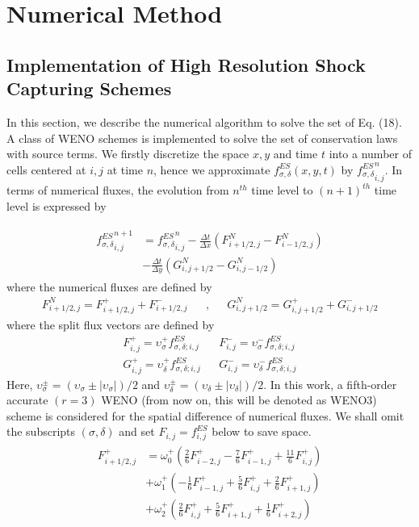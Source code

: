 \documentclass{rsproca}%
\begin{document}
\section{Numerical Method}
\label{sec:4}
\subsection{Implementation of High Resolution Shock Capturing Schemes}
\label{WENO}
In this section, we describe the numerical algorithm to solve the set  of Eq. (18).  A class of WENO schemes is implemented to solve the set of conservation laws with source terms.   We firstly discretize the space $x,y$  and time $t$ into a number of cells centered at $i,j$ at time $n$, hence we approximate $f^{ES}_{\sigma,\delta}(x,y,t)$ by ${f^{ES}_{\sigma,\delta}}_{i,j}^{n}$. In terms of numerical fluxes, the evolution from $n^{th}$ time level to $(n+1)^{th}$ time level is expressed by

\begin{align}
	\begin{split}
{f^{ES}_{\sigma,\delta}}_{i,j}^{n+1} &= {f^{ES}_{\sigma,\delta}}_{i,j}^{n}
-\frac{\Delta t}{\Delta x}\left(F_{i+1/2,j}^N-F_{i-1/2,j}^N\right) \\
&-\frac{\Delta t}{\Delta y}\left(G_{i,j+1/2}^N - G_{i,j-1/2}^N\right)
	\end{split}
\end{align}
where the numerical fluxes are defined by
\begin{align}
&F_{i+1/2,j}^N=F_{i+1/2,j}^+ + F_{i+1/2,j}^-& &,& &G_{i,j+1/2}^N=G_{i,j+1/2}^+ + G_{i,j+1/2}^-&
\end{align}
where the split flux vectors are defined by
\begin{align}
&F_{i,j}^{+} = \upsilon_\sigma^+ f^{ES}_{\sigma,\delta;i,j}& &F_{i,j}^{-} = \upsilon_\sigma^-f^{ES}_{\sigma,\delta;i,j}& \nonumber \\
&G_{i,j}^{+} = \upsilon_\delta^+ f^{ES}_{\sigma,\delta;i,j}& &G_{i,j}^{-} = \upsilon_\delta^-f^{ES}_{\sigma,\delta;i,j}& 
\end{align}
Here, $\upsilon_\sigma^{\pm} = (\upsilon_\sigma \pm |\upsilon_\sigma |)/2$ and $\upsilon_\delta^{\pm} = (\upsilon_\delta \pm |\upsilon_\delta |)/2$.
In this work, a fifth-order accurate $(r=3)$ WENO (from now on, this will be denoted as WENO3) scheme is considered for the spatial difference of numerical fluxes.   We shall omit the subscripts $(\sigma,\delta)$ and set $F_{i,j}= f^{ES}_{i,j}$ below to save space.
\begin{align}
	\begin{split}
F_{i+1/2,j}^{+} &= \omega_{0}^{+}\left(\frac{2}{6}F_{i-2,j}^+ -\frac{7}{6}F_{i-1,j}^+ +\frac{11}{6}F_{i,j}^+\right) \\
&+ \omega_{1}^{+}\left(-\frac{1}{6}F_{i-1,j}^+ +\frac{5}{6}F_{i,j}^++\frac{2}{6}F_{i+1,j}^+\right) \\
&+ \omega_{2}^{+}\left(\frac{2}{6}F_{i,j}^+ +\frac{5}{6}F_{i+1,j}^+ +\frac{1}{6}F_{i+2,j}^+\right)
	\end{split}
\end{align}
\end{document}
